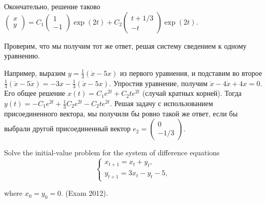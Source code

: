 \begin{solution}
Окончательно, решение таково $\left(\begin{array}{c} {x} \\ {y} \end{array}\right)=C_{1} \left(\begin{array}{c} {1} \\ {-1} \end{array}\right)\exp (2t)+C_{2} \left(\begin{array}{c} {t+1/3} \\ {-t} \end{array}\right)\exp (2t)$.

Проверим, что мы получим тот же ответ, решая систему сведением к одному уравнению.

Например, выразим $y=\frac{1}{3} (\dot{x}-5x)$ из первого уравнения, и подставим во второе $\frac{1}{3} (\ddot{x}-5\dot{x})=-3x-\frac{1}{3} (\dot{x}-5x)$. Упростив уравнение, получим $\ddot{x}-4\dot{x}+4x=0$. Его общее решение $x(t)=C_{1} e^{2t} +C_{2} te^{2t} $ (случай кратных корней). Тогда $y(t)=-C_{1} e^{2t} +\frac{1}{3} C_{2} e^{2t} -C_{2} te^{2t} $. Решая задачу с использованием присоединенного вектора, мы получили бы ровно такой же ответ, если бы выбрали другой присоединенный вектор $e_{2} =\left(\begin{array}{c} {0} \\ {-1/3} \end{array}\right)$.
\end{solution}


\begin{problem}
Solve the initial-value problem for the system of difference equations 
\[
\begin{cases} 
x_{t+1} =x_{t} +y_{t} , \\ 
y_{t+1} =3x_{t} -y_{t} -5,
\end{cases}
\]

where $x_{0} =y_{0} =0$. (Exam 2012).
\end{problem}

